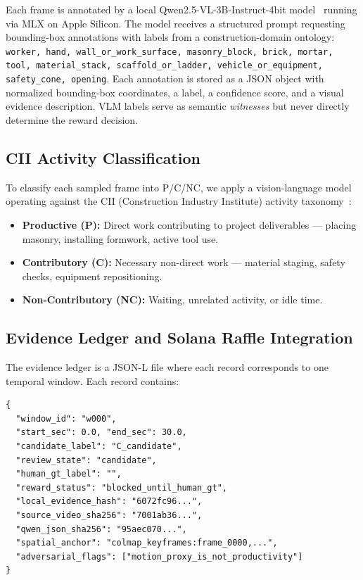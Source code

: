 \documentclass[sigconf,nonacm]{acmart}
\begin{document}
Each frame is annotated by a local Qwen2.5-VL-3B-Instruct-4bit
model~\cite{qwen2vl} running via MLX on Apple Silicon. The model receives a
structured prompt requesting bounding-box annotations with labels from a
construction-domain ontology: \texttt{worker, hand, wall\_or\_work\_surface,
masonry\_block, brick, mortar, tool, material\_stack, scaffold\_or\_ladder,
vehicle\_or\_equipment, safety\_cone, opening}. Each annotation is stored as a
JSON object with normalized bounding-box coordinates, a label, a confidence
score, and a visual evidence description. VLM labels serve as semantic
\emph{witnesses} but never directly determine the reward decision.

\subsection{CII Activity Classification}

To classify each sampled frame into P/C/NC, we apply a vision-language model
operating against the CII (Construction Industry Institute) activity
taxonomy~\cite{cii252}:
\begin{itemize}[leftmargin=1.4em,itemsep=0.1em]
\item \textbf{Productive (P):} Direct work contributing to project deliverables
  --- placing masonry, installing formwork, active tool use.
\item \textbf{Contributory (C):} Necessary non-direct work --- material staging,
  safety checks, equipment repositioning.
\item \textbf{Non-Contributory (NC):} Waiting, unrelated activity, or idle time.
\end{itemize}

\subsection{Evidence Ledger and Solana Raffle Integration}

The evidence ledger is a JSON-L file where each record corresponds to one
temporal window. Each record contains:

\begin{lstlisting}[language={}]
{
  "window_id": "w000",
  "start_sec": 0.0, "end_sec": 30.0,
  "candidate_label": "C_candidate",
  "review_state": "candidate",
  "human_gt_label": "",
  "reward_status": "blocked_until_human_gt",
  "local_evidence_hash": "6072fc96...",
  "source_video_sha256": "7001ab36...",
  "qwen_json_sha256": "95aec070...",
  "spatial_anchor": "colmap_keyframes:frame_0000,...",
  "adversarial_flags": ["motion_proxy_is_not_productivity"]
}
\end{lstlisting}
\end{document}
